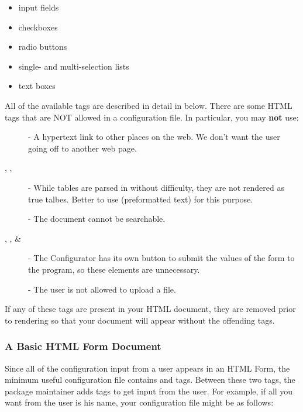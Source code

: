 \begin{itemize}
	\item input fields
	\item checkboxes
	\item radio buttons
	\item single- and multi-selection lists
	\item text boxes 
\end{itemize}
All of the available tags are described in detail in below.  There are some
HTML tags that are NOT allowed in a configuration file.  In particular, you
may \textbf{not} use:
%
\begin{description}

	\item[] - A hypertext link to other places on the web.
	We don't want the user going off to another web page.

	\item[, , ] - While tables are
	parsed in without difficulty, they are not rendered as true talbes.
	Better to use  (preformatted text) for this purpose.

	\item[] - The document cannot be searchable.

	\item[, , \& ] - The
	Configurator has its own button to submit the values of the form to the
	program, so these elements are unnecessary.

	\item[] - The user is not allowed to upload a file. 

\end{description}
%
If any of these tags are present in your HTML document, they are removed
prior to rendering so that your document will appear without the offending
tags.


\subsubsection*{A Basic HTML Form Document}

Since all of the configuration input from a user appears in an HTML Form,
the minimum useful configuration file contains  and
 tags. Between these two tags, the package maintainer adds
 tags to get input from the user. For example, if all you
want from the user is his name, your configuration file might be as
follows:


